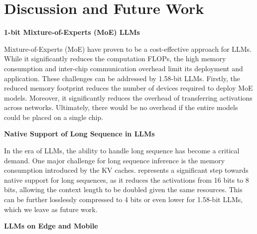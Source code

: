 \begin{table}[t]
\caption{Comparison of \our{} with StableLM-3B with 2T tokens.}
\vspace{15pt}
\label{tab:2t}
\end{table}


\section{Discussion and Future Work}

\textbf{1-bit Mixture-of-Experts (MoE) LLMs}

Mixture-of-Experts (MoE) have proven to be a cost-effective approach for LLMs. While it significantly reduces the computation FLOPs, the high memory consumption and inter-chip communication overhead limit its deployment and application. These challenges can be addressed by 1.58-bit LLMs. Firstly, the reduced memory footprint reduces the number of devices required to deploy MoE models. Moreover, it significantly reduces the overhead of transferring activations across networks. Ultimately, there would be no overhead if the entire models could be placed on a single chip.


\textbf{Native Support of Long Sequence in LLMs}

In the era of LLMs, the ability to handle long sequence has become a critical demand. One major challenge for long sequence inference is the memory consumption introduced by the KV caches. \our{} represents a significant step towards native support for long sequences, as it reduces the activations from 16 bits to 8 bits, allowing the context length to be doubled given the same resources. 
This can be further losslessly compressed to 4 bits or even lower for 1.58-bit LLMs, which we leave as future work.


\textbf{LLMs on Edge and Mobile}

